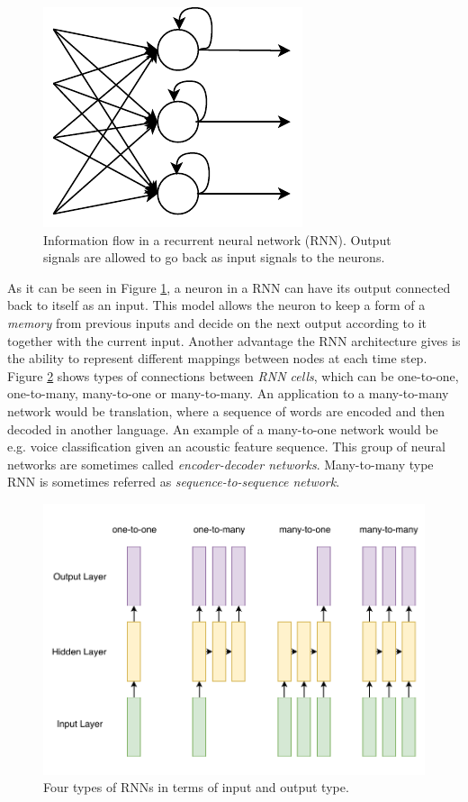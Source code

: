 \begin{figure}[t]
  \centering
  \includegraphics[width=0.3\linewidth]{img/RecurrentNeuralNet.pdf}
  \caption{Information flow in a recurrent neural network (RNN). Output signals are allowed to go back as input signals to the neurons. }
  \label{sota:rnn}
\end{figure}

As it can be seen in Figure \ref{sota:rnn}, a neuron in a RNN can have its output connected back to itself as an input. This model allows the neuron to keep a form of a \textit{memory} from previous inputs and decide on the next output according to it together with the current input. Another advantage the RNN architecture gives is the ability to represent different mappings between nodes at each time step. Figure \ref{sota:rnn_connections} shows types of connections between \textit{RNN cells}, which can be one-to-one, one-to-many, many-to-one or many-to-many. An application to a many-to-many network would be translation, where a sequence of words are encoded and then decoded in another language. An example of a many-to-one network would be e.g. voice classification given an acoustic feature sequence. This group of neural networks are sometimes called \textit{encoder-decoder networks}. Many-to-many type RNN is sometimes referred as \textit{sequence-to-sequence network}. 

\begin{figure}[t]
  \centering
  \includegraphics[width=0.8\linewidth]{img/rnn_types.pdf}
  \caption{Four types of RNNs in terms of input and output type. }
  \label{sota:rnn_connections}
\end{figure}

